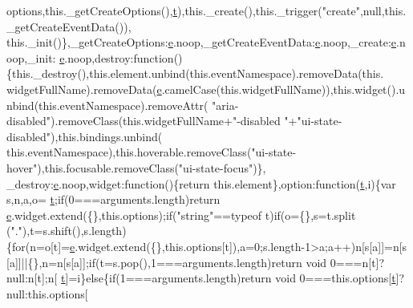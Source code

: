 \begin{DoxyCode}
      options,\textcolor{keyword}{this}.\_getCreateOptions(),\hyperlink{jquery-2_80_83_8min_8js_aaccc9105df5383111407fd5b41255e23}{t}),this.\_create(),this.\_trigger(\textcolor{stringliteral}{"create"},null,this.\_getCreateEventData()),
      this.\_init()\},\_getCreateOptions:\hyperlink{jquery-ui_8min_8js_a2c038346d47955cbe2cb91e338edd7e1}{e}.noop,\_getCreateEventData:\hyperlink{jquery-ui_8min_8js_a2c038346d47955cbe2cb91e338edd7e1}{e}.noop,\_create:\hyperlink{jquery-ui_8min_8js_a2c038346d47955cbe2cb91e338edd7e1}{e}.noop,\_init:
      \hyperlink{jquery-ui_8min_8js_a2c038346d47955cbe2cb91e338edd7e1}{e}.noop,destroy:\textcolor{keyword}{function}()\{this.\_destroy(),this.element.unbind(this.eventNamespace).removeData(this.
      widgetFullName).removeData(\hyperlink{jquery-ui_8min_8js_a2c038346d47955cbe2cb91e338edd7e1}{e}.camelCase(\textcolor{keyword}{this}.widgetFullName)),this.widget().unbind(this.eventNamespace).removeAttr(\textcolor{stringliteral}{
      "aria-disabled"}).removeClass(this.widgetFullName+\textcolor{stringliteral}{"-disabled "}+\textcolor{stringliteral}{"ui-state-disabled"}),this.bindings.unbind(
      this.eventNamespace),this.hoverable.removeClass(\textcolor{stringliteral}{"ui-state-hover"}),this.focusable.removeClass(\textcolor{stringliteral}{"ui-state-focus"})\},
      \_destroy:\hyperlink{jquery-ui_8min_8js_a2c038346d47955cbe2cb91e338edd7e1}{e}.noop,widget:\textcolor{keyword}{function}()\{\textcolor{keywordflow}{return} this.element\},option:\textcolor{keyword}{function}(\hyperlink{jquery-2_80_83_8min_8js_aaccc9105df5383111407fd5b41255e23}{t},i)\{var s,n,a,o=
      \hyperlink{jquery-2_80_83_8min_8js_aaccc9105df5383111407fd5b41255e23}{t};\textcolor{keywordflow}{if}(0===arguments.length)\textcolor{keywordflow}{return} \hyperlink{jquery-ui_8min_8js_a2c038346d47955cbe2cb91e338edd7e1}{e}.widget.extend(\{\},this.options);\textcolor{keywordflow}{if}(\textcolor{stringliteral}{"string"}==typeof t)\textcolor{keywordflow}{if}(o=\{\},s=t.split
      (\textcolor{stringliteral}{"."}),t=s.shift(),s.length)\{\textcolor{keywordflow}{for}(n=o[t]=\hyperlink{jquery-ui_8min_8js_a2c038346d47955cbe2cb91e338edd7e1}{e}.widget.extend(\{\},\textcolor{keyword}{this}.options[t]),a=0;s.length-1>a;a++)n[s[a]]=n[s
      [a]]||\{\},n=n[s[a]];\textcolor{keywordflow}{if}(t=s.pop(),1===arguments.length)\textcolor{keywordflow}{return} \textcolor{keywordtype}{void} 0===n[t]?null:n[t];n[
      \hyperlink{jquery-2_80_83_8min_8js_aaccc9105df5383111407fd5b41255e23}{t}]=i\}\textcolor{keywordflow}{else}\{\textcolor{keywordflow}{if}(1===arguments.length)\textcolor{keywordflow}{return} \textcolor{keywordtype}{void} 0===this.options[\hyperlink{jquery-2_80_83_8min_8js_aaccc9105df5383111407fd5b41255e23}{t}]?null:this.options[

\end{DoxyCode}
